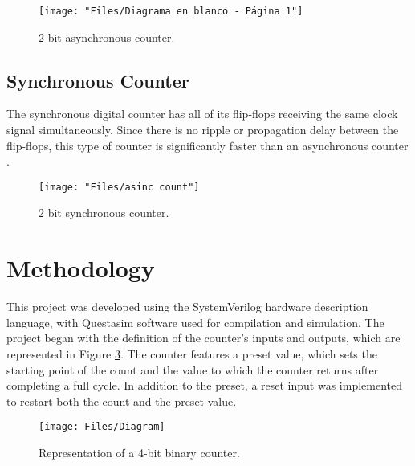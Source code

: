 \documentclass[conference]{IEEEtran}
\begin{document}
	
	\begin{figure}[H]
		\centering
		\texttt{[image: "Files/Diagrama en blanco - Página 1"]}
		\caption{2 bit asynchronous counter.}
		\label{fig:diagrama-en-blanco---pagina-1}
	\end{figure}
	
	\vspace*{2cm}
	
	\subsection{Synchronous Counter}
	The synchronous digital counter has all of its flip-flops receiving the same clock signal simultaneously.  Since there is no ripple or propagation delay between the flip-flops, this type of counter is significantly faster than an asynchronous counter \cite{floyd_fundamentos_nodate}.
	
	\begin{figure}[H]
		\centering
		\texttt{[image: "Files/asinc count"]}
		\caption{2 bit synchronous counter.}
		\label{fig:asinc-count}
	\end{figure}
	
    
	
	
	
	\section{Methodology}
	This project was developed using the SystemVerilog hardware description language, with Questasim software used for compilation and simulation. The project began with the definition of the counter's inputs and outputs, which are represented in Figure \ref{fig:diagram}. The counter features a preset value, which sets the starting point of the count and the value to which the counter returns after completing a full cycle. In addition to the preset, a reset input was implemented to restart both the count and the preset value.
	
	\begin{figure}[H]
		\centering
		\texttt{[image: Files/Diagram]}
		\caption{Representation of a 4-bit binary counter.}
		\label{fig:diagram}
	\end{figure}
	
\end{document}
